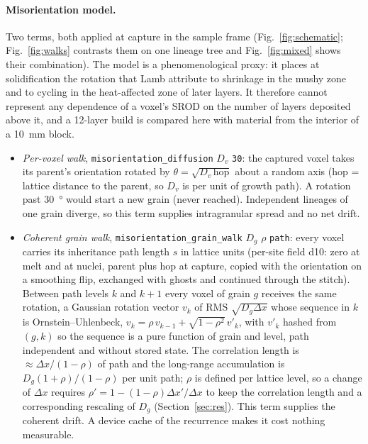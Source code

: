 \documentclass[11pt,a4paper]{article}
\newcommand{\code}[1]{\texttt{#1}}
\begin{document}
\paragraph{Misorientation model.} Two terms, both applied at capture in the sample frame (Fig.~\ref{fig:schematic}; Fig.~\ref{fig:walks} contrasts them on one lineage tree and Fig.~\ref{fig:mixed} shows their combination). The model is a phenomenological proxy: it places at solidification the rotation that Lamb attribute to shrinkage in the mushy zone and to cycling in the heat-affected zone of later layers. It therefore cannot represent any dependence of a voxel's SROD on the number of layers deposited above it, and a 12-layer build is compared here with material from the interior of a \SI{10}{\milli\metre} block.
\begin{itemize}
\item \emph{Per-voxel walk}, \code{misorientation\_diffusion} $D_v$ \code{30}: the captured voxel takes its parent's orientation rotated by $\theta = \sqrt{D_v\,\mathrm{hop}}$ about a random axis (hop = lattice distance to the parent, so $D_v$ is per unit of growth path). A rotation past \SI{30}{\degree} would start a new grain (never reached). Independent lineages of one grain diverge, so this term supplies intragranular spread and no net drift.
\item \emph{Coherent grain walk}, \code{misorientation\_grain\_walk} $D_g$ $\rho$ \code{path}: every voxel carries its inheritance path length $s$ in lattice units (per-site field d10: zero at melt and at nuclei, parent plus hop at capture, copied with the orientation on a smoothing flip, exchanged with ghosts and continued through the stitch). Between path levels $k$ and $k+1$ every voxel of grain $g$ receives the same rotation, a Gaussian rotation vector $v_k$ of RMS $\sqrt{D_g \Delta x}$ whose sequence in $k$ is Ornstein--Uhlenbeck, $v_k = \rho\,v_{k-1} + \sqrt{1-\rho^2}\,v'_k$, with $v'_k$ hashed from $(g, k)$ so the sequence is a pure function of grain and level, path independent and without stored state. The correlation length is $\approx \Delta x/(1-\rho)$ of path and the long-range accumulation is $D_g (1+\rho)/(1-\rho)$ per unit path; $\rho$ is defined per lattice level, so a change of $\Delta x$ requires $\rho' = 1 - (1-\rho)\Delta x'/\Delta x$ to keep the correlation length and a corresponding rescaling of $D_g$ (Section~\ref{sec:res}). This term supplies the coherent drift. A device cache of the recurrence makes it cost nothing measurable.
\end{itemize}
\end{document}

